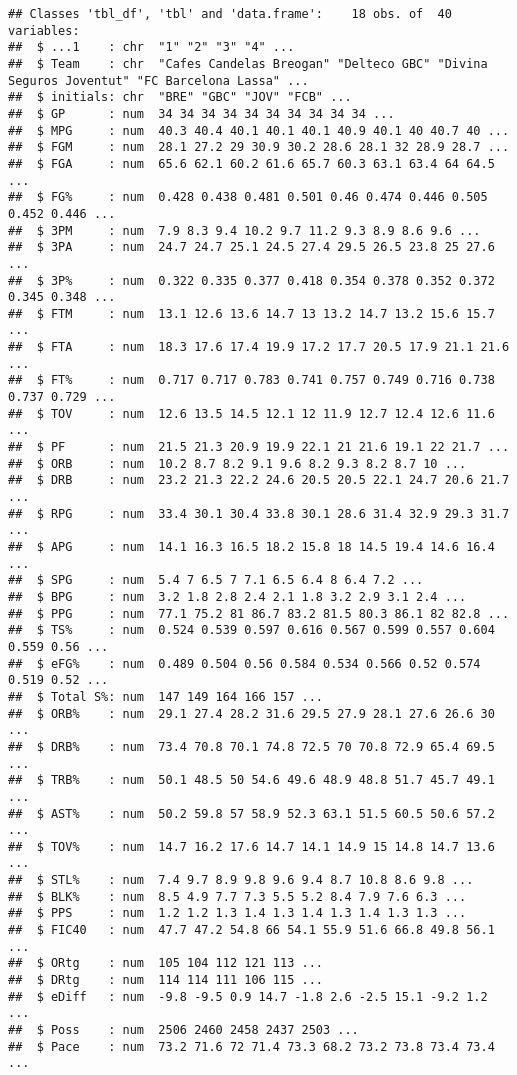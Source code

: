 \documentclass[]{article}
\begin{document}
\begin{verbatim}
## Classes 'tbl_df', 'tbl' and 'data.frame':    18 obs. of  40 variables:
##  $ ...1    : chr  "1" "2" "3" "4" ...
##  $ Team    : chr  "Cafes Candelas Breogan" "Delteco GBC" "Divina Seguros Joventut" "FC Barcelona Lassa" ...
##  $ initials: chr  "BRE" "GBC" "JOV" "FCB" ...
##  $ GP      : num  34 34 34 34 34 34 34 34 34 34 ...
##  $ MPG     : num  40.3 40.4 40.1 40.1 40.1 40.9 40.1 40 40.7 40 ...
##  $ FGM     : num  28.1 27.2 29 30.9 30.2 28.6 28.1 32 28.9 28.7 ...
##  $ FGA     : num  65.6 62.1 60.2 61.6 65.7 60.3 63.1 63.4 64 64.5 ...
##  $ FG%     : num  0.428 0.438 0.481 0.501 0.46 0.474 0.446 0.505 0.452 0.446 ...
##  $ 3PM     : num  7.9 8.3 9.4 10.2 9.7 11.2 9.3 8.9 8.6 9.6 ...
##  $ 3PA     : num  24.7 24.7 25.1 24.5 27.4 29.5 26.5 23.8 25 27.6 ...
##  $ 3P%     : num  0.322 0.335 0.377 0.418 0.354 0.378 0.352 0.372 0.345 0.348 ...
##  $ FTM     : num  13.1 12.6 13.6 14.7 13 13.2 14.7 13.2 15.6 15.7 ...
##  $ FTA     : num  18.3 17.6 17.4 19.9 17.2 17.7 20.5 17.9 21.1 21.6 ...
##  $ FT%     : num  0.717 0.717 0.783 0.741 0.757 0.749 0.716 0.738 0.737 0.729 ...
##  $ TOV     : num  12.6 13.5 14.5 12.1 12 11.9 12.7 12.4 12.6 11.6 ...
##  $ PF      : num  21.5 21.3 20.9 19.9 22.1 21 21.6 19.1 22 21.7 ...
##  $ ORB     : num  10.2 8.7 8.2 9.1 9.6 8.2 9.3 8.2 8.7 10 ...
##  $ DRB     : num  23.2 21.3 22.2 24.6 20.5 20.5 22.1 24.7 20.6 21.7 ...
##  $ RPG     : num  33.4 30.1 30.4 33.8 30.1 28.6 31.4 32.9 29.3 31.7 ...
##  $ APG     : num  14.1 16.3 16.5 18.2 15.8 18 14.5 19.4 14.6 16.4 ...
##  $ SPG     : num  5.4 7 6.5 7 7.1 6.5 6.4 8 6.4 7.2 ...
##  $ BPG     : num  3.2 1.8 2.8 2.4 2.1 1.8 3.2 2.9 3.1 2.4 ...
##  $ PPG     : num  77.1 75.2 81 86.7 83.2 81.5 80.3 86.1 82 82.8 ...
##  $ TS%     : num  0.524 0.539 0.597 0.616 0.567 0.599 0.557 0.604 0.559 0.56 ...
##  $ eFG%    : num  0.489 0.504 0.56 0.584 0.534 0.566 0.52 0.574 0.519 0.52 ...
##  $ Total S%: num  147 149 164 166 157 ...
##  $ ORB%    : num  29.1 27.4 28.2 31.6 29.5 27.9 28.1 27.6 26.6 30 ...
##  $ DRB%    : num  73.4 70.8 70.1 74.8 72.5 70 70.8 72.9 65.4 69.5 ...
##  $ TRB%    : num  50.1 48.5 50 54.6 49.6 48.9 48.8 51.7 45.7 49.1 ...
##  $ AST%    : num  50.2 59.8 57 58.9 52.3 63.1 51.5 60.5 50.6 57.2 ...
##  $ TOV%    : num  14.7 16.2 17.6 14.7 14.1 14.9 15 14.8 14.7 13.6 ...
##  $ STL%    : num  7.4 9.7 8.9 9.8 9.6 9.4 8.7 10.8 8.6 9.8 ...
##  $ BLK%    : num  8.5 4.9 7.7 7.3 5.5 5.2 8.4 7.9 7.6 6.3 ...
##  $ PPS     : num  1.2 1.2 1.3 1.4 1.3 1.4 1.3 1.4 1.3 1.3 ...
##  $ FIC40   : num  47.7 47.2 54.8 66 54.1 55.9 51.6 66.8 49.8 56.1 ...
##  $ ORtg    : num  105 104 112 121 113 ...
##  $ DRtg    : num  114 114 111 106 115 ...
##  $ eDiff   : num  -9.8 -9.5 0.9 14.7 -1.8 2.6 -2.5 15.1 -9.2 1.2 ...
##  $ Poss    : num  2506 2460 2458 2437 2503 ...
##  $ Pace    : num  73.2 71.6 72 71.4 73.3 68.2 73.2 73.8 73.4 73.4 ...
\end{verbatim}
\end{document}
